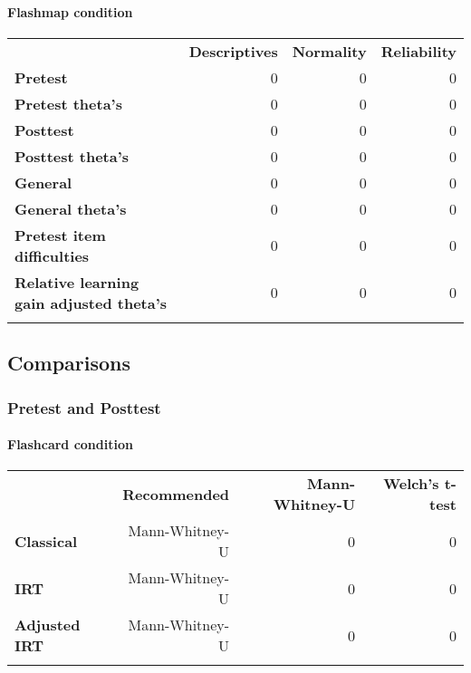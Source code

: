 \paragraph{Flashmap condition}\label{flashmap-condition-2}

\begin{longtable}[c]{@{}lrrr@{}}
\toprule\addlinespace
& \textbf{Descriptives} & \textbf{Normality} & \textbf{Reliability}
\\\addlinespace
\midrule\endhead
\textbf{Pretest} & 0 & 0 & 0
\\\addlinespace
\textbf{Pretest theta's} & 0 & 0 & 0
\\\addlinespace
\textbf{Posttest} & 0 & 0 & 0
\\\addlinespace
\textbf{Posttest theta's} & 0 & 0 & 0
\\\addlinespace
\textbf{General} & 0 & 0 & 0
\\\addlinespace
\textbf{General theta's} & 0 & 0 & 0
\\\addlinespace
\textbf{Pretest item difficulties} & 0 & 0 & 0
\\\addlinespace
\textbf{Relative learning gain adjusted theta's} & 0 & 0 & 0
\\\addlinespace
\bottomrule
\end{longtable}

\subsection{Comparisons}\label{comparisons}

\subsubsection{Pretest and Posttest}\label{pretest-and-posttest}

\paragraph{Flashcard condition}\label{flashcard-condition-3}

\begin{longtable}[c]{@{}lrrr@{}}
\toprule\addlinespace
& \textbf{Recommended} & \textbf{Mann-Whitney-U} & \textbf{Welch's
t-test}
\\\addlinespace
\midrule\endhead
\textbf{Classical} & Mann-Whitney-U & 0 & 0
\\\addlinespace
\textbf{IRT} & Mann-Whitney-U & 0 & 0
\\\addlinespace
\textbf{Adjusted IRT} & Mann-Whitney-U & 0 & 0
\\\addlinespace
\bottomrule
\end{longtable}


